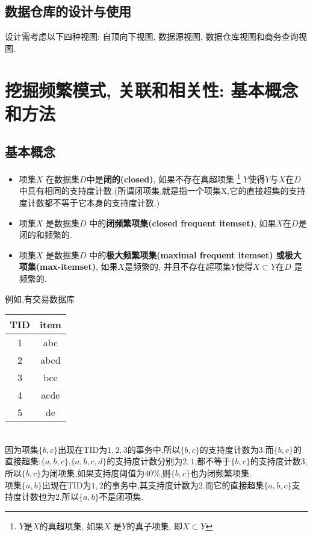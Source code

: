 \documentclass{article}
\begin{document}
\subsection{数据仓库的设计与使用}
设计需考虑以下四种视图: 自顶向下视图, 数据源视图, 数据仓库视图和商务查询视图.

\section{挖掘频繁模式, 关联和相关性: 基本概念和方法}
\subsection{基本概念}
\begin{itemize}
	\item 项集$X$ 在数据集$D$中是\textbf{闭的(closed)}, 如果不存在真超项集
\footnote{$Y$是$X$的真超项集, 如果$X$ 是$Y$的真子项集, 即$X \subset Y$}
$Y$使得$Y$与$X$在$D$中具有相同的支持度计数.(所谓闭项集,就是指一个项集X,它的直接超集的支持度计数都不等于它本身的支持度计数.)
	\item 项集$X$ 是数据集$D$ 中的\textbf{闭频繁项集(closed frequent itemset)}, 如果$X$在$D$是闭的和频繁的.\\
	\item 项集$X$ 是数据集$D$ 中的\textbf{极大频繁项集(maximal frequent itemset) 或极大项集(max-itemset)}, 如果$X$是频繁的, 并且不存在超项集$Y$使得$X \subset Y$在$D$ 是频繁的.
\end{itemize}

\begin{example}
例如,有交易数据库
\begin{table}[htbp]  %
  \centering
  \begin{tabular}{|c|c|}
\hline
TID& item\\
\hline
1& abc\\
\hline
2& abcd\\
\hline
3& bce\\
\hline
4& acde\\
\hline
5& de\\
\hline
\end{tabular}
\end{table}\\
因为项集$\{b,c\}$出现在TID为$1,2,3$的事务中,所以$\{b,c\}$的支持度计数为$3$.而$\{b,c\}$的直接超集:$\{a,b,c\}$,$\{a,b,c,d\}$的支持度计数分别为$2,1$,都不等于$\{b,c\}$的支持度计数$3$,所以$\{b,c\}$为闭项集,如果支持度阈值为$40\%$,则$\{b,c\}$也为闭频繁项集.\\
项集$\{a,b\}$出现在TID为$1,2$的事务中,其支持度计数为$2$.而它的直接超集$\{a,b,c\}$支持度计数也为$2$,所以$\{a,b\}$不是闭项集.
\end{example}
\end{document}
